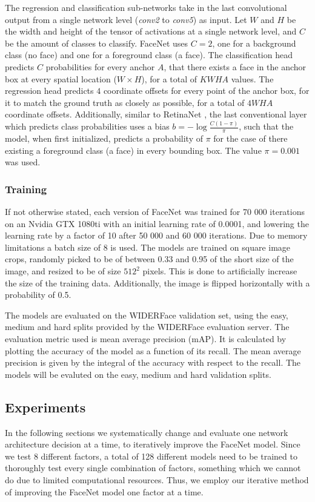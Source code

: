 \documentclass[paperwidth=48in,paperheight=48in, fontscale=0.4166666666666, landscape]{baposter}
\begin{document}
\begin{poster}
{The regression and classification sub-networks take in the last convolutional output from a single network level (\textit{conv2} to \textit{conv5}) as input. Let $W$ and $H$ be the width and height of the tensor of activations at a single network level, and $C$ be the amount of classes to classify. FaceNet uses $C=2$, one for a background class (no face) and one for a foreground class (a face). The classification head predicts $C$ probabilities for every anchor $A$, that there exists a face in the anchor box at every spatial location ($W \times H$), for a total of $KWHA$ values. The regression head predicts $4$ coordinate offsets for every point of the anchor box, for it to match the ground truth as closely as possible, for a total of $4WHA$ coordinate offsets. Additionally, similar to RetinaNet \cite{retinanet}, the last conventional layer which predicts class probabilities uses a bias $b = -\log{\frac{C(1-\pi)}{\pi}}$, such that the model, when first initialized, predicts a probability of $\pi$ for the case of there existing a foreground class (a face) in every bounding box. The value $\pi = 0.001$ was used.

\subsubsection{Training}
If not otherwise stated, each version of FaceNet was trained for 70 000 iterations on an Nvidia GTX 1080ti with an initial learning rate of 0.0001, and lowering the learning rate by a factor of 10 after 50 000 and 60 000 iterations. Due to memory limitations a batch size of 8 is used. The models are trained on square image crops, randomly picked to be of between 0.33 and 0.95 of the short size of the image, and resized to be of size $512^2$ pixels. This is done to artificially increase the size of the training data. Additionally, the image is flipped horizontally with a probability of 0.5.

The models are evaluated on the WIDERFace validation set, using the easy, medium and hard splits provided by the WIDERFace evaluation server. The evaluation metric used is mean average precision (mAP). It is calculated by plotting the accuracy of the model as a function of its recall. The mean average precision is given by the integral of the accuracy with respect to the recall. The models will be evaluted on the easy, medium and hard validation splits.

\subsection{Experiments}
In the following sections we systematically change and evaluate one network architecture decision at a time, to iteratively improve the FaceNet model. Since we test 8 different factors, a total of 128 different models need to be trained to thoroughly test every single combination of factors, something which we cannot do due to limited computational resources. Thus, we employ our iterative method of improving the FaceNet model one factor at a time.

}
\end{poster}
\end{document}
